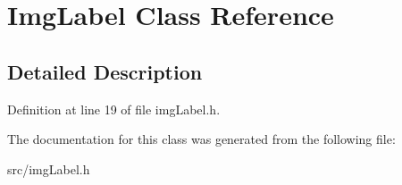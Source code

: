 \hypertarget{classImgLabel}{
\section{ImgLabel Class Reference}
\label{classImgLabel}
}


\subsection{Detailed Description}


Definition at line 19 of file imgLabel.h.

The documentation for this class was generated from the following file:\begin{DoxyCompactItemize}
\item 
src/imgLabel.h\end{DoxyCompactItemize}
